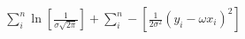 \documentclass[preview]{standalone}
\begin{document}
\begin{align*}
\sum_i^n \ln [ \frac{1}{\sigma \sqrt{2 \pi}} ] + \sum_i^n - [ \frac{1}{2\sigma^2} (y_i -\omega x_i)^2 ]
\end{align*}
\end{document}
